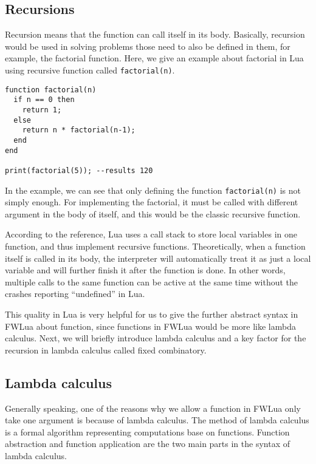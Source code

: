 \subsection{Recursions}\label{sec:recursions}

Recursion means that the function can call itself in its body. Basically, recursion would be used in solving problems those need to also be defined in them, for example, the factorial function. Here, we give an example about factorial in Lua using recursive function called {\tt factorial(n)}.

\begin{verbatim}
function factorial(n)
  if n == 0 then
    return 1;
  else
    return n * factorial(n-1);
  end
end

print(factorial(5)); --results 120
\end{verbatim}

In the example, we can see that only defining the function {\tt factorial(n)} is not simply enough. For implementing the factorial, it must be called with different argument in the body of itself, and this would be the classic recursive function.

According to the reference\cite{begLua}, Lua uses a call stack to store local variables in one function, and thus implement recursive functions. Theoretically, when a function itself is called in its body, the interpreter will automatically treat it as just a local variable and will further finish it after the function is done. In other words, multiple calls to the same function can be active at the same time without the crashes reporting ``undefined'' in Lua.

This quality in Lua is very helpful for us to give the further abstract syntax in FWLua about function, since functions in FWLua would be more like lambda calculus. Next, we will briefly introduce lambda calculus and a key factor for the recursion in lambda calculus called fixed combinatory.

\subsection{Lambda calculus}
Generally speaking, one of the reasons why we allow a function in FWLua only take one argument is because of lambda calculus. The method of lambda calculus is a formal algorithm representing computations base on functions. Function abstraction and function application are the two main parts in the syntax of lambda calculus. 


